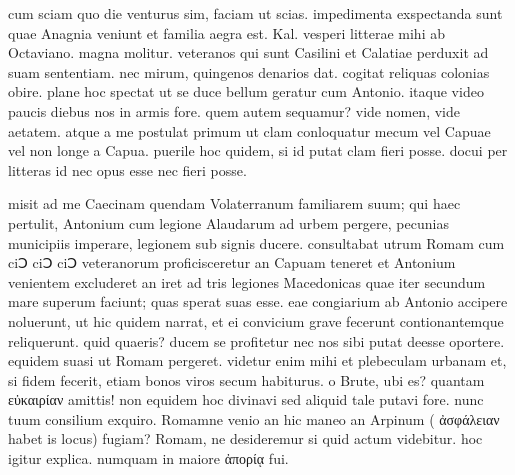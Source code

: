 


 cum sciam quo die venturus sim, faciam ut scias. impedimenta exspectanda sunt quae Anagnia veniunt et familia aegra est. Kal. vesperi litterae mihi ab Octaviano. magna molitur. veteranos qui sunt Casilini et Calatiae perduxit ad suam sententiam. nec mirum, quingenos denarios dat. cogitat reliquas colonias obire. plane hoc spectat ut se duce bellum geratur cum Antonio. itaque video paucis diebus nos in armis fore. quem autem sequamur? vide nomen, vide aetatem. atque a me postulat primum ut clam conloquatur mecum vel Capuae vel non longe a Capua. puerile hoc quidem, si id putat clam fieri posse. docui per litteras id nec opus esse nec fieri posse.

 misit ad me Caecinam quendam Volaterranum familiarem suum; qui haec pertulit, Antonium cum legione Alaudarum ad urbem pergere, pecunias municipiis imperare, legionem sub signis ducere. consultabat utrum Romam cum ciↃ ciↃ ciↃ veteranorum proficisceretur an Capuam teneret et Antonium venientem excluderet an iret ad tris legiones Macedonicas quae iter secundum mare superum faciunt; quas sperat suas esse. eae congiarium ab Antonio accipere noluerunt, ut hic quidem narrat, et ei convicium grave fecerunt contionantemque reliquerunt. quid quaeris? ducem se profitetur nec nos sibi putat deesse oportere. equidem suasi ut Romam pergeret. videtur enim mihi et plebeculam urbanam et, si fidem fecerit, etiam bonos viros secum habiturus. o Brute, ubi es? quantam εὐκαιρίαν amittis! non equidem hoc divinavi sed aliquid tale putavi fore. nunc tuum consilium exquiro. Romamne venio an hic maneo an Arpinum ( ἀσφάλειαν habet is locus) fugiam? Romam, ne desideremur si quid actum videbitur. hoc igitur explica. numquam in maiore ἀπορίᾳ fui.
